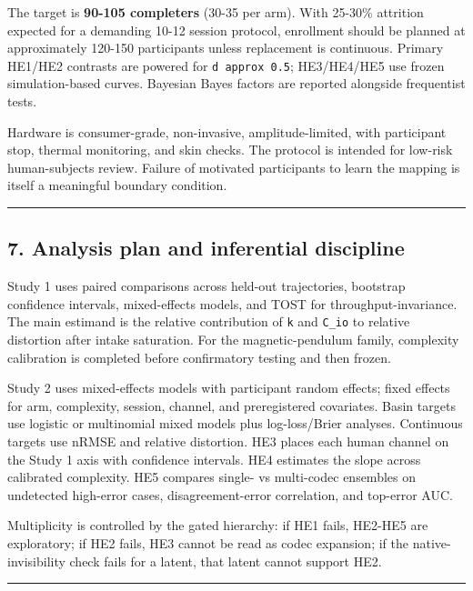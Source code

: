 \documentclass[
  11pt,
]{article}
\begin{document}
The target is \textbf{90-105 completers} (30-35 per
arm). With 25-30\% attrition expected for a demanding
10-12 session protocol, enrollment should be planned at
approximately 120-150 participants unless replacement
is continuous. Primary HE1/HE2 contrasts are powered
for \texttt{d\ approx\ 0.5}; HE3/HE4/HE5 use frozen
simulation-based curves. Bayesian Bayes factors are
reported alongside frequentist tests.

Hardware is consumer-grade, non-invasive,
amplitude-limited, with participant stop, thermal
monitoring, and skin checks. The protocol is intended
for low-risk human-subjects review. Failure of
motivated participants to learn the mapping is itself a
meaningful boundary condition.

\begin{center}\rule{0.5\linewidth}{0.5pt}\end{center}

\subsection{7. Analysis plan and inferential
discipline}\label{analysis-plan-and-inferential-discipline}

Study 1 uses paired comparisons across held-out
trajectories, bootstrap confidence intervals,
mixed-effects models, and TOST for
throughput-invariance. The main estimand is the
relative contribution of \texttt{k} and \texttt{C\_io}
to relative distortion after intake saturation. For the
magnetic-pendulum family, complexity calibration is
completed before confirmatory testing and then frozen.

Study 2 uses mixed-effects models with participant
random effects; fixed effects for arm, complexity,
session, channel, and preregistered covariates. Basin
targets use logistic or multinomial mixed models plus
log-loss/Brier analyses. Continuous targets use nRMSE
and relative distortion. HE3 places each human channel
on the Study 1 axis with confidence intervals. HE4
estimates the slope across calibrated complexity. HE5
compares single- vs multi-codec ensembles on undetected
high-error cases, disagreement-error correlation, and
top-error AUC.

Multiplicity is controlled by the gated hierarchy: if
HE1 fails, HE2-HE5 are exploratory; if HE2 fails, HE3
cannot be read as codec expansion; if the
native-invisibility check fails for a latent, that
latent cannot support HE2.

\begin{center}\rule{0.5\linewidth}{0.5pt}\end{center}
\end{document}
